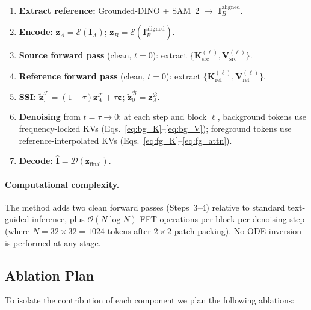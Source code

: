 \begin{enumerate}[leftmargin=*, nosep]
    \item \textbf{Extract reference:} Grounded-DINO + SAM~2 $\to$
          $\mathbf{I}_B^{\text{aligned}}$.
    \item \textbf{Encode:} $\mathbf{z}_A = \mathcal{E}(\mathbf{I}_A)$;\quad
          $\mathbf{z}_B = \mathcal{E}(\mathbf{I}_B^{\text{aligned}})$.
    \item \textbf{Source forward pass} (clean, $t=0$):
          extract $\{\mathbf{K}_{\mathrm{src}}^{(\ell)}, \mathbf{V}_{\mathrm{src}}^{(\ell)}\}$.
    \item \textbf{Reference forward pass} (clean, $t=0$):
          extract $\{\mathbf{K}_{\mathrm{ref}}^{(\ell)}, \mathbf{V}_{\mathrm{ref}}^{(\ell)}\}$.
    \item \textbf{SSI:}
          $\tilde{\mathbf{z}}_\tau^{\mathcal{F}} = (1-\tau)\mathbf{z}_A^{\mathcal{F}}
          + \tau\boldsymbol{\varepsilon}$;\quad
          $\tilde{\mathbf{z}}_0^{\mathcal{B}} = \mathbf{z}_A^{\mathcal{B}}$.
    \item \textbf{Denoising} from $t=\tau \to 0$: at each step and block $\ell$,
          background tokens use frequency-locked KVs
          (Eqs.~\ref{eq:bg_K}--\ref{eq:bg_V});
          foreground tokens use reference-interpolated KVs
          (Eqs.~\ref{eq:fg_K}--\ref{eq:fg_attn}).
    \item \textbf{Decode:} $\hat{\mathbf{I}} = \mathcal{D}(\mathbf{z}_{\text{final}})$.
\end{enumerate}

\paragraph{Computational complexity.}
The method adds two clean forward passes (Steps~3--4) relative to standard text-guided
inference, plus $\mathcal{O}(N \log N)$ FFT operations per block per denoising step
(where $N = 32 \times 32 = 1024$ tokens after $2\times2$ patch packing).
No ODE inversion is performed at any stage.

\subsection{Ablation Plan}
\label{sec:ablation}

To isolate the contribution of each component we plan the following ablations:

